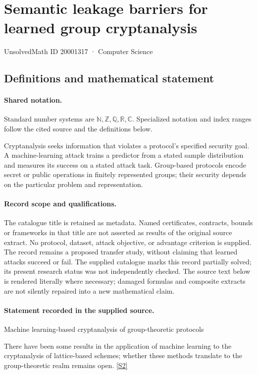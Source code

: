 \documentclass[11pt]{article}
\newcommand{\sref}[2]{\hyperlink{source:#1:#2}{[S#2]}}
\begin{document}
\setcounter{section}{20001316}
\section{Semantic leakage barriers for learned group cryptanalysis}\label{20001317}
{\small\sffamily UnsolvedMath ID 20001317 · Computer Science}
\subsection{Definitions and mathematical statement}

\paragraph{Shared notation.}Standard number systems are $\mathbb N,\mathbb Z,\mathbb Q,\mathbb R,\mathbb C$. Specialized notation and index ranges follow the cited source and the definitions below.


Cryptanalysis seeks information that violates a protocol's specified security goal. A machine-learning attack trains a predictor from a stated sample distribution and measures its success on a stated attack task. Group-based protocols encode secret or public operations in finitely represented groups; their security depends on the particular problem and representation.
\paragraph{Record scope and qualifications.}
The catalogue title is retained as metadata. Named certificates, contracts, bounds or frameworks in that title are not asserted as results of the original source extract.
No protocol, dataset, attack objective, or advantage criterion is supplied. The record remains a proposed transfer study, without claiming that learned attacks succeed or fail. The supplied catalogue marks this record partially solved; its present research status was not independently checked.
The source text below is rendered literally where necessary; damaged formulas and composite extracts are not silently repaired into a new mathematical claim.
\paragraph{Statement recorded in the supplied source.}
Machine learning-based cryptanalysis of group-theoretic protocols

There have been some results in the application of machine learning to the cryptanalysis of lattice-based schemes; whether these methods translate to the group-theoretic realm remains open. \sref{20001317}{2}
\end{document}
